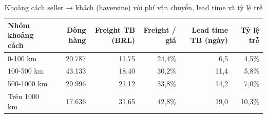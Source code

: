 \begin{table}[htbp]
\centering\small
\caption{Khoảng cách seller → khách (haversine) với phí vận chuyển, lead time và tỷ lệ trễ}
\label{tab:distance}
\begin{tabular}{lrrrrr}
\toprule
\textbf{Nhóm khoảng cách} & \textbf{Dòng hàng} & \textbf{Freight TB (BRL)} & \textbf{Freight / giá} & \textbf{Lead time TB (ngày)} & \textbf{Tỷ lệ trễ} \\
\midrule
0-100 km & 20.787 & 11,75 & 24,4\% & 6,5 & 4,5\% \\
100-500 km & 43.133 & 18,40 & 30,2\% & 11,4 & 5,8\% \\
500-1000 km & 29.996 & 21,12 & 33,8\% & 14,2 & 7,0\% \\
Trên 1000 km & 17.636 & 31,65 & 42,8\% & 19,0 & 10,3\% \\
\bottomrule
\end{tabular}
\end{table}
